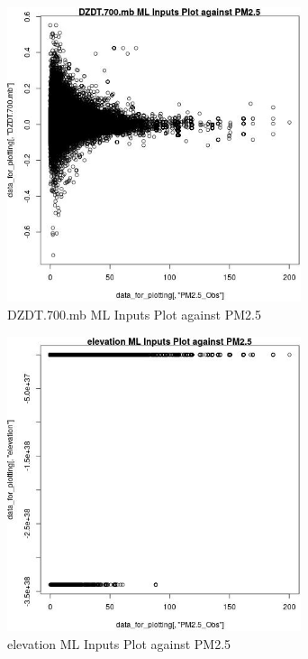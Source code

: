 \begin{figure} 
\centering  
\includegraphics[width=0.77\textwidth]{Code_Outputs/ML_input_report_ML_input_PM25_Step5_part_d_de_duplicated_aves_ML_input_DZDT700mbvPM25_Obs.jpg} 
\caption{\label{fig:ML_input_report_ML_input_PM25_Step5_part_d_de_duplicated_aves_ML_inputDZDT700mbvPM25_Obs}DZDT.700.mb ML Inputs Plot against PM2.5} 
\end{figure} 
 

\begin{figure} 
\centering  
\includegraphics[width=0.77\textwidth]{Code_Outputs/ML_input_report_ML_input_PM25_Step5_part_d_de_duplicated_aves_ML_input_elevationvPM25_Obs.jpg} 
\caption{\label{fig:ML_input_report_ML_input_PM25_Step5_part_d_de_duplicated_aves_ML_inputelevationvPM25_Obs}elevation ML Inputs Plot against PM2.5} 
\end{figure} 
 

